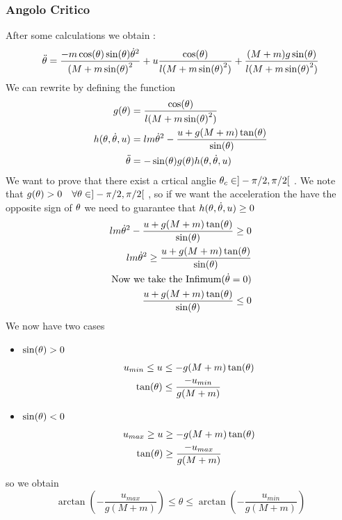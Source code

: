  \subsubsection{Angolo Critico}
 After some calculations we obtain : 
 \[\ddot{\theta} = \frac{-m\cos(\theta)\sin(\theta)\dot{\theta}^2}{(M+m\sin(\theta)^2} + u\frac{\cos(\theta)}{l(M+m\sin(\theta)^2)} + \frac{(M+m)g\sin(\theta)}{l(M+m\sin(\theta)^2)}\]
We can rewrite by defining the function 
\begin{align*}
	g(\theta) &= \frac{\cos(\theta)}{l(M+m\sin(\theta)^2)} \\
	h(\theta , \dot{\theta} , u ) &= lm\dot{\theta}^2 - \frac{u + g(M+m)\tan(\theta)}{\sin(\theta)} \\
	\ddot{\theta} &= - \sin(\theta) g(\theta)  h(\theta,\dot{\theta},u) 
\end{align*}
We want to prove that there exist a crtical anglie $\theta_c \in ]-\pi/2 , \pi/2[$ . We note that $g(\theta) > 0  \quad \forall \theta \in ] -\pi/2 , \pi/2 [$ , so if we want the acceleration the have the opposite sign of $\theta$ we need to guarantee that $h(\theta , \dot{\theta} , u) \geq 0 $
\begin{align*}
	lm\dot{\theta}^2 - \frac{u + g(M+m)\tan(\theta)}{\sin(\theta)} \geq 0  \\
	lm\dot{\theta}^2 \geq  \frac{u + g(M+m)\tan(\theta)}{\sin(\theta)}   \\
	\text{Now we take the Infimum} (\dot{\theta} = 0 )\\
	\frac{u + g(M+m)\tan(\theta)}{\sin(\theta)} \leq 0	
\end{align*} 
 We now have two cases
 \begin{itemize}
 \item $\sin(\theta) > 0 $ 
 \begin{align*}
 	u_{min} \leq u &\leq -g(M+m)\tan(\theta)\\
 	\tan(\theta) &\leq \frac{-u_{min}}{g(M+m)}
 \end{align*}
 \item  $\sin(\theta) < 0 $ 
  \begin{align*}
 	u_{max} \geq u & \geq -g(M+m)\tan(\theta)\\
 	\tan(\theta) &\geq \frac{-u_{max}}{g(M+m)}
 \end{align*}
 \end{itemize}
 so we obtain 
 \[\arctan(-\frac{u_{max}}{g(M+m)} )\leq \theta \leq \arctan(-\frac{u_{min}}{g(M+m)} )\]

 
 
 
 
 
 
 
 